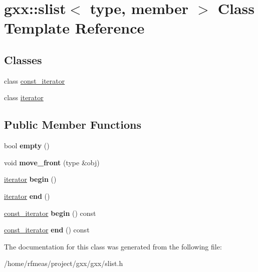 \hypertarget{classgxx_1_1slist}{}\section{gxx\+:\+:slist$<$ type, member $>$ Class Template Reference}
\label{classgxx_1_1slist}
\subsection*{Classes}
\begin{DoxyCompactItemize}
\item 
class \hyperlink{classgxx_1_1slist_1_1const__iterator}{const\+\_\+iterator}
\item 
class \hyperlink{classgxx_1_1slist_1_1iterator}{iterator}
\end{DoxyCompactItemize}
\subsection*{Public Member Functions}
\begin{DoxyCompactItemize}
\item 
bool {\bfseries empty} ()\hypertarget{classgxx_1_1slist_a61a31c579305c6a1c6b1d4cdc83fc292}{}\label{classgxx_1_1slist_a61a31c579305c6a1c6b1d4cdc83fc292}

\item 
void {\bfseries move\+\_\+front} (type \&obj)\hypertarget{classgxx_1_1slist_a2e8af98980073570dc8ca32507c33c91}{}\label{classgxx_1_1slist_a2e8af98980073570dc8ca32507c33c91}

\item 
\hyperlink{classgxx_1_1slist_1_1iterator}{iterator} {\bfseries begin} ()\hypertarget{classgxx_1_1slist_aeaf543a7c5d283c09d8ccd1d411317ac}{}\label{classgxx_1_1slist_aeaf543a7c5d283c09d8ccd1d411317ac}

\item 
\hyperlink{classgxx_1_1slist_1_1iterator}{iterator} {\bfseries end} ()\hypertarget{classgxx_1_1slist_a225ea8dc68c4b0a0c9cdaf6141c9ae45}{}\label{classgxx_1_1slist_a225ea8dc68c4b0a0c9cdaf6141c9ae45}

\item 
\hyperlink{classgxx_1_1slist_1_1const__iterator}{const\+\_\+iterator} {\bfseries begin} () const \hypertarget{classgxx_1_1slist_a9e85ec4c2c207959c71b43a9c3674a80}{}\label{classgxx_1_1slist_a9e85ec4c2c207959c71b43a9c3674a80}

\item 
\hyperlink{classgxx_1_1slist_1_1const__iterator}{const\+\_\+iterator} {\bfseries end} () const \hypertarget{classgxx_1_1slist_a99b22eeefaaf1ada0e044033ca598a16}{}\label{classgxx_1_1slist_a99b22eeefaaf1ada0e044033ca598a16}

\end{DoxyCompactItemize}


The documentation for this class was generated from the following file\+:\begin{DoxyCompactItemize}
\item 
/home/rfmeas/project/gxx/gxx/slist.\+h\end{DoxyCompactItemize}
